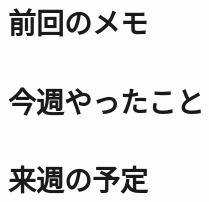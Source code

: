 \documentclass[12pt, a4paper]{jsarticle}
\begin{document}
\section*{前回のメモ}

\section*{今週やったこと}

\section*{来週の予定}
\end{document}
